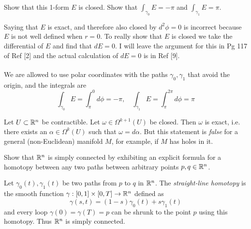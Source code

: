 \documentclass[10pt]{article}
\begin{document}
\begin{example}
	Show that this 1-form $E$ is closed. Show that $\int_{\gamma_0}E=-\pi$ and $\int_{\gamma_1}E=\pi$.
\end{example}
\sol Saying that $E$ is exact, and therefore also closed by $d^2\phi = 0$ is incorrect because $E$ is not well defined when $r=0$. To really show that $E$ is closed we take the differential of $E$ and find that $dE=0$. I will leave the argument for this in Pg 117 of Ref [2] and the actual calculation of $dE=0$ is in Ref [9].\\\\
We are allowed to use polar coordinates with the paths $\gamma_0, \gamma_1$ that avoid the origin, and the integrals are
$$
\int_{\gamma_0} E = \int_{\pi}^{0} d\phi = -\pi, \quad \int_{\gamma_1} E = \int_{\pi}^{2\pi} d\phi = \pi
$$

\begin{definition}
	 Let $U \subset \mathbb{R}^n$ be contractible. Let $\omega \in \Omega^{k+1}(U)$ be closed. Then $\omega$ is exact, i.e. there exists an $\alpha \in \Omega^k(U)$ such that $\omega = d\alpha$. But this statement is \emph{false} for a general (non-Euclidean) manifold $M$, for example, if $M$ has holes in it.
\end{definition}


\begin{example}\label{b1e81}
	Show that $\mathbb{R}^n$ is simply connected by exhibiting an explicit formula for a homotopy between any two paths between arbitrary points $p,q \in \mathbb{R}^n$.
\end{example}
\sol Let $\gamma_0(t), \gamma_1(t)$ be two paths from $p$ to $q$ in $\mathbb{R}^n$. The \emph{straight-line homotopy} is the smooth function $\gamma:[0,1]\times[0,T]\to \mathbb{R}^n$ defined as
$$
\gamma(s,t) = (1-s)\gamma_0(t)+s\gamma_1(t)
$$
and every loop $\gamma(0)=\gamma(T)=p$ can be shrunk to the point $p$ using this homotopy. Thus $\mathbb{R}^n$ is simply connected.
\end{document}
